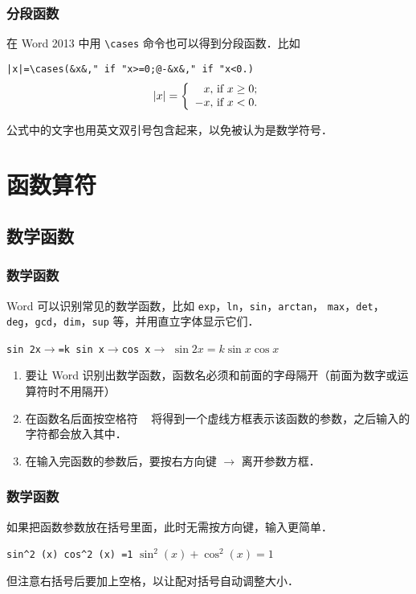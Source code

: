 \documentclass[12pt,notheorems,xcolor={rgb}]{beamer}
\let\lst=\lstinline
\newcommand{\rightkey}{\textcolor{text1!70!back1}{$\rightarrow$}}
\newenvironment{framex}{\begin{frame}[fragile=singleslide,environment=framex]}{\end{frame}}
\begin{document}
\begin{framex}
\frametitle{分段函数}
在 Word 2013 中用 \lst!\cases! 命令也可以得到分段函数．比如
\begin{examplev}
\lst!|x|=\cases(&x&," if "x>=0;@-&x&," if "x<0.) !
\tcblower
$$|x|=\left\{\begin{array}{l@{}l}
\phantom{-}x, & \text{\ if\ } x \ge 0; \\
          -x, & \text{\ if\ } x < 0.
\end{array}\right.$$
\end{examplev}
公式中的文字也用英文双引号包含起来，以免被认为是数学符号．
\end{framex}

\section{函数算符}

\subsection{数学函数}

\begin{framex}
\frametitle{数学函数}
Word 可以识别常见的数学函数，比如 \lst!exp!，\lst!ln!，\lst!sin!，\lst!arctan!，
\lst!max!，\lst!det!，\lst!deg!，\lst!gcd!，\lst!dim!，\lst!sup! 等，并用直立字体显示它们．
\begin{exampleh}[0.58]
\lst!sin 2x!\rightkey\lst!=k sin x!\rightkey\lst!cos x!\rightkey
\tcblower
$\sin 2x = k\sin x\cos x$
\end{exampleh}
\begin{enumerate}
  \item 要让 Word 识别出数学函数，函数名必须和前面的字母隔开（前面为数字或运算符时不用隔开）
  \item 在函数名后面按空格符 \lst! ! 将得到一个虚线方框表示该函数的参数，之后输入的字符都会放入其中．
  \item 在输入完函数的参数后，要按右方向键 \rightkey{} 离开参数方框．
\end{enumerate}
\end{framex}

\begin{framex}
\frametitle{数学函数}
如果把函数参数放在括号里面，此时无需按方向键，输入更简单．
\begin{exampleh}[0.55]
\lst!sin^2 (x) cos^2 (x) =1!
\tcblower
$\sin^2(x) + \cos^2(x) =1$
\end{exampleh}
但注意右括号后要加上空格，以让配对括号自动调整大小．
\end{framex}
\end{document}
